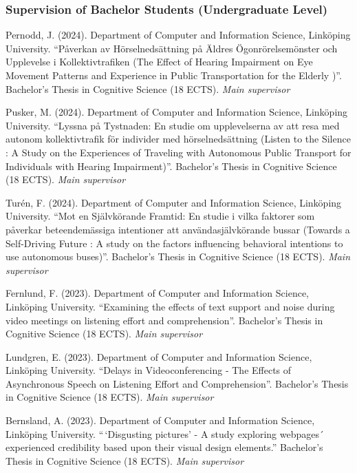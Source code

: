 \documentclass[]{article}
\begin{document}
\subsubsection{Supervision of Bachelor Students (Undergraduate
Level)}\label{supervision-of-bachelor-students-undergraduate-level}

Pernodd, J. (2024). Department of Computer and Information Science,
Linköping University. ``Påverkan av Hörselnedsättning på Äldres
Ögonrörelsemönster och Upplevelse i Kollektivtrafiken (The Effect of
Hearing Impairment on Eye Movement Patterns and Experience in Public
Transportation for the Elderly )''. Bachelor's Thesis in Cognitive
Science (18 ECTS). \emph{Main supervisor}

Pusker, M. (2024). Department of Computer and Information Science,
Linköping University. ``Lyssna på Tystnaden: En studie om upplevelserna
av att resa med autonom kollektivtrafik för individer med
hörselnedsättning (Listen to the Silence : A Study on the Experiences of
Traveling with Autonomous Public Transport for Individuals with Hearing
Impairment)''. Bachelor's Thesis in Cognitive Science (18 ECTS).
\emph{Main supervisor}

Turén, F. (2024). Department of Computer and Information Science,
Linköping University. ``Mot en Självkörande Framtid: En studie i vilka
faktorer som påverkar beteendemässiga intentioner att
användasjälvkörande bussar (Towards a Self-Driving Future : A study on
the factors influencing behavioral intentions to use autonomous
buses)''. Bachelor's Thesis in Cognitive Science (18 ECTS). \emph{Main
supervisor}

Fernlund, F. (2023). Department of Computer and Information Science,
Linköping University. ``Examining the effects of text support and noise
during video meetings on listening effort and comprehension''.
Bachelor's Thesis in Cognitive Science (18 ECTS). \emph{Main supervisor}

Lundgren, E. (2023). Department of Computer and Information Science,
Linköping University. ``Delays in Videoconferencing - The Effects of
Asynchronous Speech on Listening Effort and Comprehension''. Bachelor's
Thesis in Cognitive Science (18 ECTS). \emph{Main supervisor}

Bernsland, A. (2023). Department of Computer and Information Science,
Linköping University. ``\,`Disgusting pictures' - A study exploring
webpages´ experienced credibility based upon their visual design
elements.'' Bachelor's Thesis in Cognitive Science (18 ECTS). \emph{Main
supervisor}
\end{document}
